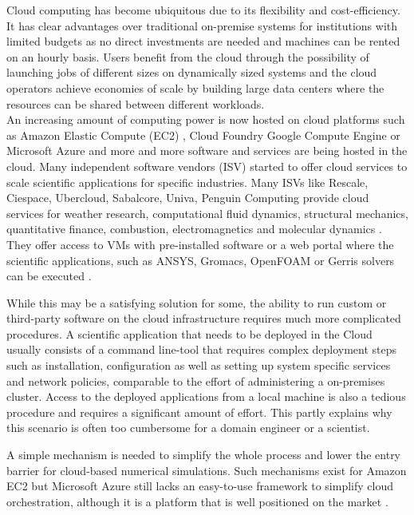 \documentclass[3p,times]{elsarticle}
\begin{document}
Cloud computing has become ubiquitous due to its flexibility and cost-efficiency. It has clear advantages over traditional on-premise systems for institutions with limited budgets as no direct investments are needed and machines can be rented on an hourly basis. Users benefit from the cloud through the possibility of launching jobs of different sizes on dynamically sized systems and the cloud operators achieve economies of scale by building large data centers where the resources can be shared between different workloads. \\
An increasing amount of computing power is now hosted on cloud platforms such as Amazon Elastic Compute (EC2) \cite{ec2}, Cloud Foundry Google Compute Engine \cite{google} or Microsoft Azure \cite{azure} and more and more software and services are being hosted in the cloud. Many independent software vendors (ISV) started to offer cloud services to scale scientific applications for specific industries. Many ISVs like Rescale, Ciespace, Ubercloud, Sabalcore, Univa, Penguin Computing provide cloud services for weather research, computational fluid dynamics, structural mechanics, quantitative finance, combustion, electromagnetics and molecular dynamics \cite{theuebercloud}. They offer access to VMs with pre-installed software or a web portal where the scientific applications, such as ANSYS, Gromacs, OpenFOAM or Gerris solvers can be executed \cite{Popinet2003}.

While this may be a satisfying solution for some, the ability to run custom or third-party software on the cloud infrastructure requires much more complicated procedures. A scientific application that needs to be deployed in the Cloud usually consists of a command line-tool that requires complex deployment steps such as installation, configuration as well as setting up system specific services and network policies, comparable to the effort of administering a on-premises cluster. Access to the deployed applications from a local machine is also a tedious procedure and requires a significant amount of effort. This partly explains why this scenario is often too cumbersome for a domain engineer or a scientist.  

A simple mechanism is needed to simplify the whole process and lower the entry barrier for cloud-based numerical simulations. Such mechanisms exist for Amazon EC2 \cite{ec2} \cite{eucalyptus} but Microsoft Azure still lacks an easy-to-use framework to simplify cloud  orchestration, although it is a platform that is well positioned on the market \cite{Garg2013}.
\end{document}
